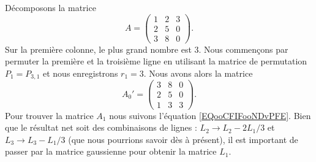 \begin{example}     \label{EXooAZTDooTUXZJb}
	Décomposons la matrice
	\begin{equation}
		A=\begin{pmatrix}
			1 & 2 & 3 \\
			2 & 5 & 0 \\
			3 & 8 & 0
		\end{pmatrix}.
	\end{equation}
	Sur la première colonne, le plus grand nombre est \( 3\). Nous commençons par permuter la première et la troisième ligne en utilisant la matrice de permutation \( P_1=P_{3,1}\) et nous enregistrons \( r_1=3\). Nous avons alors la matrice
	\begin{equation}        \label{EQooJCCLooOZVajj}
		A_0'=\begin{pmatrix}
			3 & 8 & 0 \\
			2 & 5 & 0 \\
			1 & 3 & 3
		\end{pmatrix}.
	\end{equation}
	Pour trouver la matrice \( A_1\) nous suivons l'équation \eqref{EQooCFIFooNDvPFE}. Bien que le résultat net soit des combinaisons de lignes : \( L_2\to L_2-2L_1/3\) et \( L_3\to L_3-L_1/3\) (que nous pourrions savoir dès à présent), il est important de passer par la matrice gaussienne pour obtenir la matrice \( L_1\).


\end{example}
